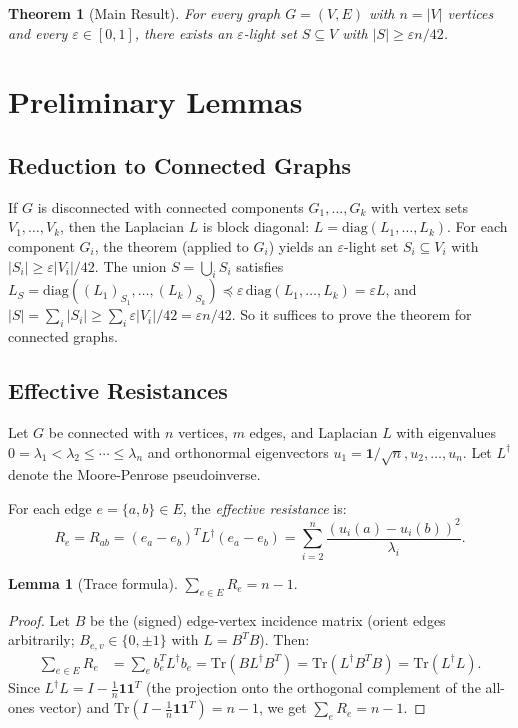 \documentclass[12pt]{article}
\newtheorem{theorem}{Theorem}
\newtheorem{lemma}{Lemma}
\theoremstyle{definition}
\begin{document}
\begin{theorem}[Main Result]\label{thm:main}
For every graph $G = (V,E)$ with $n = |V|$ vertices and every $\varepsilon \in [0,1]$, there exists an $\varepsilon$-light set $S \subseteq V$ with $|S| \geq \varepsilon n / 42$.
\end{theorem}

\section{Preliminary Lemmas}

\subsection{Reduction to Connected Graphs}

If $G$ is disconnected with connected components $G_1, \ldots, G_k$ with vertex sets $V_1,\ldots,V_k$, then the Laplacian $L$ is block diagonal: $L = \mathrm{diag}(L_1,\ldots,L_k)$. For each component $G_i$, the theorem (applied to $G_i$) yields an $\varepsilon$-light set $S_i \subseteq V_i$ with $|S_i| \geq \varepsilon |V_i| / 42$. The union $S = \bigcup_i S_i$ satisfies $L_S = \mathrm{diag}((L_1)_{S_1},\ldots,(L_k)_{S_k}) \preceq \varepsilon\,\mathrm{diag}(L_1,\ldots,L_k) = \varepsilon L$, and $|S| = \sum_i |S_i| \geq \sum_i \varepsilon|V_i|/42 = \varepsilon n/42$. So it suffices to prove the theorem for connected graphs.

\subsection{Effective Resistances}

Let $G$ be connected with $n$ vertices, $m$ edges, and Laplacian $L$ with eigenvalues $0 = \lambda_1 < \lambda_2 \leq \cdots \leq \lambda_n$ and orthonormal eigenvectors $u_1 = \mathbf{1}/\sqrt{n}, u_2, \ldots, u_n$. Let $L^\dagger$ denote the Moore-Penrose pseudoinverse.

For each edge $e = \{a,b\} \in E$, the \emph{effective resistance} is:
$$R_e = R_{ab} = (e_a - e_b)^T L^\dagger (e_a - e_b) = \sum_{i=2}^n \frac{(u_i(a) - u_i(b))^2}{\lambda_i}.$$

\begin{lemma}[Trace formula]\label{lem:trace}
$\sum_{e \in E} R_e = n - 1.$
\end{lemma}

\begin{proof}
Let $B$ be the (signed) edge-vertex incidence matrix (orient edges arbitrarily; $B_{e,v} \in \{0,\pm 1\}$ with $L = B^T B$). Then:
\begin{align*}
\sum_{e\in E} R_e &= \sum_e b_e^T L^\dagger b_e = \mathrm{Tr}(B L^\dagger B^T) = \mathrm{Tr}(L^\dagger B^T B) = \mathrm{Tr}(L^\dagger L).
\end{align*}
Since $L^\dagger L = I - \frac{1}{n}\mathbf{1}\mathbf{1}^T$ (the projection onto the orthogonal complement of the all-ones vector) and $\mathrm{Tr}(I - \frac{1}{n}\mathbf{1}\mathbf{1}^T) = n - 1$, we get $\sum_e R_e = n-1$.
\end{proof}
\end{document}
